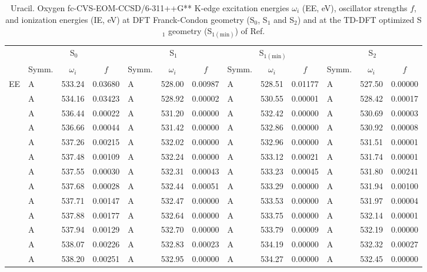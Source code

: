 \documentclass[journal=jctcce,manuscript=article]{achemso}
\begin{document}
\begin{table}
\caption{Uracil.  Oxygen fc-CVS-EOM-CCSD/6-311++G** K-edge excitation energies $\omega_i$ (EE, eV), oscillator strengths $f$, and ionization energies (IE, eV) at DFT Franck-Condon geometry (S$_0$, S$_1$ and S$_2$) and at the TD-DFT optimized S$_1$ geometry (S$_{1(\text{min})}$) of Ref. 
\label{Tab:Uracil_DFT:Oxygen}}
\scriptsize
\begin{tabular}{l|lcc|lcc|lcc|lcc}
\cline{2-13}
& \multicolumn{3}{c|}{S$_0$}
& \multicolumn{3}{c|}{S$_1$}  
& \multicolumn{3}{c|}{S$_{1(\text{min})}$}
& \multicolumn{3}{c}{S$_2$}
\\
\cline{2-13}
& Symm. & $\omega_i$ & $f$ 
& Symm. & $\omega_i$ & $f$ 
& Symm. & $\omega_i$ & $f$ 
& Symm. & $\omega_i$ & $f$\\
\hline
  EE 
& A & 533.24 & 0.03680 & A & 528.00 & 0.00987 & A & 528.51 & 0.01177 & A & 527.50 & 0.00000 \\
& A & 534.16 & 0.03423 & A & 528.92 & 0.00002 & A & 530.55 & 0.00001 & A & 528.42 & 0.00017 \\
& A & 536.44 & 0.00022 & A & 531.20 & 0.00000 & A & 532.42 & 0.00000 & A & 530.69 & 0.00003 \\
& A & 536.66 & 0.00044 & A & 531.42 & 0.00000 & A & 532.86 & 0.00000 & A & 530.92 & 0.00008 \\
& A & 537.26 & 0.00215 & A & 532.02 & 0.00000 & A & 532.96 & 0.00000 & A & 531.51 & 0.00001 \\
& A & 537.48 & 0.00109 & A & 532.24 & 0.00000 & A & 533.12 & 0.00021 & A & 531.74 & 0.00001 \\
& A & 537.55 & 0.00030 & A & 532.31 & 0.00043 & A & 533.23 & 0.00045 & A & 531.80 & 0.00241 \\
& A & 537.68 & 0.00028 & A & 532.44 & 0.00051 & A & 533.29 & 0.00000 & A & 531.94 & 0.00100 \\
& A & 537.71 & 0.00147 & A & 532.47 & 0.00000 & A & 533.53 & 0.00000 & A & 531.97 & 0.00004 \\
& A & 537.88 & 0.00177 & A & 532.64 & 0.00000 & A & 533.75 & 0.00000 & A & 532.14 & 0.00001 \\
& A & 537.94 & 0.00129 & A & 532.70 & 0.00000 & A & 533.79 & 0.00009 & A & 532.19 & 0.00000 \\
& A & 538.07 & 0.00226 & A & 532.83 & 0.00023 & A & 534.19 & 0.00000 & A & 532.32 & 0.00027 \\
& A & 538.20 & 0.00251 & A & 532.95 & 0.00000 & A & 534.27 & 0.00000 & A & 532.45 & 0.00000 \\

\end{tabular}
\end{table}
\end{document}
